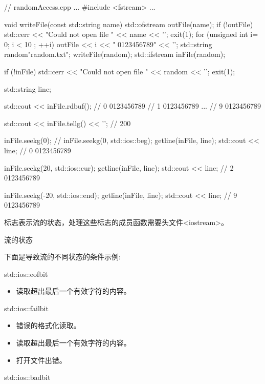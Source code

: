 \begin{cpp}
// randomAccess.cpp
...
#include <fstream>
...

void writeFile(const std::string name){
	std::ofstream outFile(name);
	if (!outFile){
		std::cerr << "Could not open file " << name << '\n';
		exit(1);
	}
	for (unsigned int i= 0; i < 10 ; ++i){
		outFile << i << " 0123456789" << '\n';
	}
}
std::string random{"random.txt"};
writeFile(random);
std::ifstream inFile(random);

if (!inFile){
	std::cerr << "Could not open file " << random << '\n';
	exit(1);
}

std::string line;

std::cout << inFile.rdbuf();
// 0 0123456789
// 1 0123456789
...
// 9 0123456789

std::cout << inFile.tellg() << '\n'; // 200

inFile.seekg(0); // inFile.seekg(0, std::ios::beg);
getline(inFile, line);
std::cout << line; // 0 0123456789

inFile.seekg(20, std::ios::cur);
getline(inFile, line);
std::cout << line; // 2 0123456789

inFile.seekg(-20, std::ios::end);
getline(inFile, line);
std::cout << line; // 9 0123456789
\end{cpp}


标志表示流的状态，处理这些标志的成员函数需要头文件<iostream>。

\begin{center}
流的状态
\end{center}

下面是导致流的不同状态的条件示例:


std::ios::eofbit

\begin{itemize}
\item 
读取超出最后一个有效字符的内容。
\end{itemize}

std::ios::failbit

\begin{itemize}
\item 
错误的格式化读取。

\item 
读取超出最后一个有效字符的内容。

\item 
打开文件出错。
\end{itemize}

std::ios::badbit

